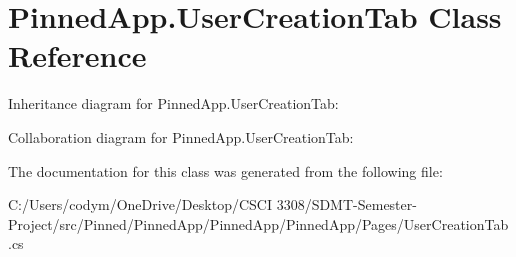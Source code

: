\hypertarget{class_pinned_app_1_1_user_creation_tab}{}\section{Pinned\+App.\+User\+Creation\+Tab Class Reference}
\label{class_pinned_app_1_1_user_creation_tab}


Inheritance diagram for Pinned\+App.\+User\+Creation\+Tab\+:


Collaboration diagram for Pinned\+App.\+User\+Creation\+Tab\+:


The documentation for this class was generated from the following file\+:\begin{DoxyCompactItemize}
\item 
C\+:/\+Users/codym/\+One\+Drive/\+Desktop/\+C\+S\+C\+I 3308/\+S\+D\+M\+T-\/\+Semester-\/\+Project/src/\+Pinned/\+Pinned\+App/\+Pinned\+App/\+Pinned\+App/\+Pages/User\+Creation\+Tab.\+cs\end{DoxyCompactItemize}
